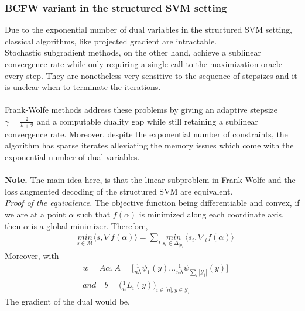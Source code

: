 \documentclass{article}
\begin{document}
\subsubsection{BCFW variant in the structured SVM setting}
Due to the exponential number of dual variables in the structured SVM setting, classical algorithms, like projected gradient are intractable.
\\
Stochastic subgradient methods, on the other hand, achieve a sublinear convergence rate while only requiring a single call to the maximization oracle every step. They are nonetheless very sensitive to the sequence of stepsizes and it is unclear when to terminate the iterations.
\\
\\
Frank-Wolfe methods address these problems by giving an  adaptive stepsize $\gamma= \frac{2}{k+2}$ and a computable duality gap while still retaining a sublinear convergence rate. Moreover, despite the exponential number of constraints, the algorithm has sparse iterates alleviating the memory issues which come with the exponential number of dual variables.\\
\\
\textbf{Note.} The main idea here, is that the linear subproblem in Frank-Wolfe and the loss augmented decoding of the structured SVM are equivalent.
\\
\textit{Proof of the equivalence.} The objective function being differentiable and convex, if we are at a point $\alpha$ 
such that $f(\alpha)$ is minimized along each coordinate axis, then $\alpha$ is a global minimizer. Therefore,
\begin{equation*}
\begin{aligned}
    &\underset{s\in\mathcal{M}}{\textit{min}}\langle s, \nabla f(\alpha)\rangle = \sum_{i}\underset{s_{i}\in\Delta_{|\mathcal{Y}_{i}|}}{\textit{min}}\langle s_{i}, \nabla_{i} f(\alpha)\rangle
\end{aligned}
\end{equation*}
Moreover, with 
\begin{equation*}
\begin{aligned}
   &w=A\alpha, A=\Big[\frac{1}{n\lambda}\psi_{1}(y)...\frac{1}{n\lambda}\psi_{\sum_{i}|\mathcal{Y}_{i}|}(y)\Big]\\
   &\textit{and}\quad b=\Big(\frac{1}{n}L_{i}(y)\Big)_{i\in\big[n\big],y\in\mathcal{Y}_{i}}
\end{aligned}
\end{equation*} 
The gradient of the dual would be, 
\end{document}
